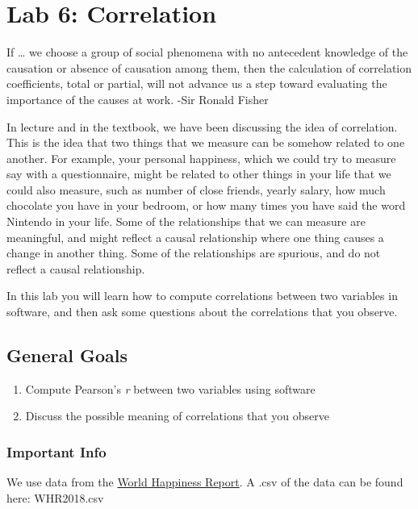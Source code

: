 \documentclass[
]{book}
\providecommand{\tightlist}{%
  \setlength{\itemsep}{0pt}\setlength{\parskip}{0pt}}
\begin{document}
\hypertarget{lab-6-correlation}{%
\chapter{Lab 6: Correlation}\label{lab-6-correlation}}

{
If \ldots{} we choose a group of social phenomena with no antecedent knowledge of the causation or absence of causation among them, then the calculation of correlation coefficients, total or partial, will not advance us a step toward evaluating the importance of the causes at work.
-Sir Ronald Fisher
}

In lecture and in the textbook, we have been discussing the idea of correlation. This is the idea that two things that we measure can be somehow related to one another. For example, your personal happiness, which we could try to measure say with a questionnaire, might be related to other things in your life that we could also measure, such as number of close friends, yearly salary, how much chocolate you have in your bedroom, or how many times you have said the word Nintendo in your life. Some of the relationships that we can measure are meaningful, and might reflect a causal relationship where one thing causes a change in another thing. Some of the relationships are spurious, and do not reflect a causal relationship.

In this lab you will learn how to compute correlations between two variables in software, and then ask some questions about the correlations that you observe.

\hypertarget{general-goals-2}{%
\section{General Goals}\label{general-goals-2}}

\begin{enumerate}
\def\labelenumi{\arabic{enumi}.}
\tightlist
\item
  Compute Pearson's \emph{r} between two variables using software
\item
  Discuss the possible meaning of correlations that you observe
\end{enumerate}

\hypertarget{important-info-2}{%
\subsection{Important Info}\label{important-info-2}}

We use data from the \href{http://worldhappiness.report}{World Happiness Report}. A .csv of the data can be found here: WHR2018.csv
\end{document}
